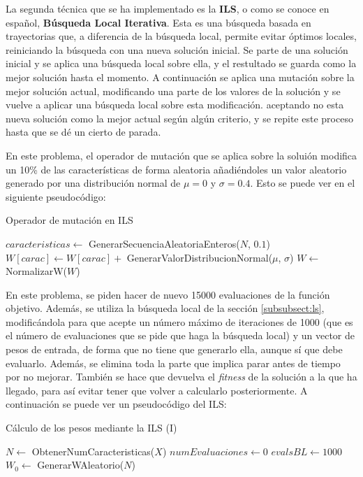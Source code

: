 \documentclass[11pt,a4paper]{article}
\begin{document}
La segunda técnica que se ha implementado es la \textbf{ILS}, o como se conoce en español, \textbf{Búsqueda Local Iterativa}.
Esta es una búsqueda basada en trayectorias que, a diferencia de la búsqueda local, permite evitar óptimos locales, reiniciando
la búsqueda con una nueva solución inicial. Se parte de una solución inicial y se aplica una búsqueda local sobre ella, y el
restultado se guarda como la mejor solución hasta el momento. A continuación se aplica una mutación sobre la mejor solución
actual, modificando una parte de los valores de la solución y se vuelve a aplicar una búsqueda local sobre esta modificación.
aceptando no esta nueva solución como la mejor actual según algún criterio, y se repite este proceso hasta que se dé un cierto 
de parada.

En este problema, el operador de mutación que se aplica sobre la soluión modifica un 10\% de las características de forma aleatoria
añadiéndoles un valor aleatorio generado por una distribución normal de $\mu = 0$ y $\sigma = 0.4$. Esto se puede ver en el
siguiente pseudocódigo:

\begin{algorithm}[H]
\caption{Operador de mutación en ILS}
\begin{algorithmic}[1]
\State $caracteristicas \gets $ GenerarSecuenciaAleatoriaEnteros($N$, $0.1$)
	\State $W[carac] \gets W[carac] + $ GenerarValorDistribucionNormal($\mu$, $\sigma$)
\EndFor
\State $W \gets$ NormalizarW($W$)
\State {}
\EndFunction
\end{algorithmic}
\end{algorithm}

En este problema, se piden hacer de nuevo 15000 evaluaciones de la función objetivo. Además, se utiliza la búsqueda local
de la sección \ref{subsubsect:ls}, modificándola para que acepte un número máximo de iteraciones de 1000 (que es el número
de evaluaciones que se pide que haga la búsqueda local) y un vector de pesos de entrada, de forma que no tiene que generarlo
ella, aunque sí que debe evaluarlo. Además, se elimina toda la parte que implica parar antes de tiempo por no mejorar. También
se hace que devuelva el \textit{fitness} de la solución a la que ha llegado, para así evitar tener que volver a calcularlo
posteriormente. A continuación se puede ver un pseudocódigo del ILS:

\begin{algorithm}[H]
\caption{Cálculo de los pesos mediante la ILS (I)}
\begin{algorithmic}[1]
\State $N \gets$ ObtenerNumCaracteristicas($X$)
\State $numEvaluaciones \gets 0$
\State $evalsBL \gets 1000$
\State $W_0 \gets$ GenerarWAleatorio($N$)
\end{algorithmic}
\end{algorithm}
\end{document}
